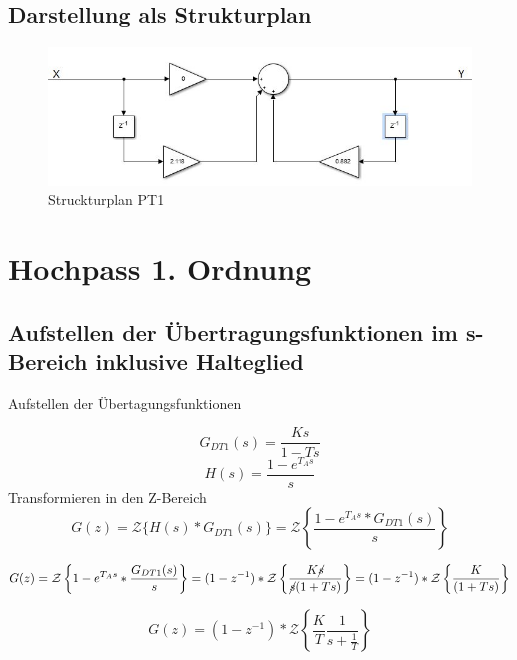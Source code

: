 \documentclass[12pt,a4paper]{report}
\begin{document}
\section{Darstellung als Strukturplan}
\begin{figure}[ht]
	\centering
	\includegraphics[width=0.8\linewidth]{marius/PT1}
	\caption{Struckturplan PT1}
	\label{fig:PT1}
\end{figure}

\chapter{Hochpass 1. Ordnung}
\section{Aufstellen der Übertragungsfunktionen im s-Bereich inklusive Halteglied}
Aufstellen der Übertagungsfunktionen

\begin{equation}
G_{DT1}(s) = \frac{Ks}{1-Ts} 
\end{equation}
\begin{equation}
H(s) = \frac{1-e^{T_As}}{s}
\end{equation}
Transformieren in den Z-Bereich
\begin{equation}
G(z) = \mathcal{Z}\{H(s)*G_{DT1}(s)\} = \mathcal{Z}\left\{\frac{1-e^{T_As}* G_{DT1}(s)}{s}\right\}
\end{equation}

\begin{equation}
G(z) = \mathcal{Z}\left\{1-e^{T_As}*\frac{G_{DT1}(s)}{s}\right\} = (1-z^{-1})*\mathcal{Z}\left\{\frac{K\cancel{s}}{\cancel{s}(1+Ts)}\right\} = (1-z^{-1})*\mathcal{Z}\left\{\frac{K}{(1+Ts)}\right\}
\end{equation}

\begin{equation}
G(z) = (1-z^{-1})*\mathcal{Z}\left\{\frac{K}{T}\frac{1}{s+\frac{1}{T}}\right\}
\end{equation}
\end{document}
